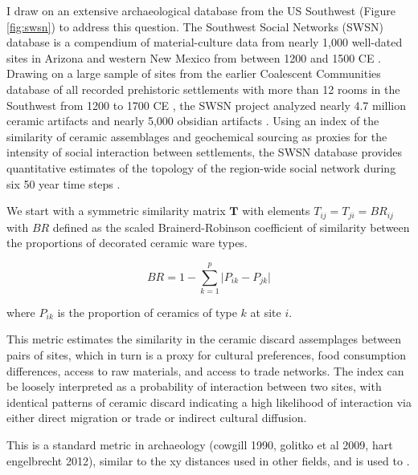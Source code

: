 \documentclass[fleqn,10pt]{wlscirep}
\begin{document}
I draw on an extensive archaeological database from the US Southwest (Figure \ref{fig:swsn}) to address this question. The Southwest Social Networks (SWSN) database is a compendium of material-culture data from nearly 1,000 well-dated sites in Arizona and western New Mexico from between 1200 and 1500 CE \cite{Mills2012,Mills2013a,Peeples2013,Borck2015,Hill2015,Mills2015a}. Drawing on a large sample of sites from the earlier Coalescent Communities database of all recorded prehistoric settlements with more than 12 rooms in the Southwest from 1200 to 1700 CE \cite{Hill2004}, the SWSN project analyzed nearly 4.7 million ceramic artifacts and nearly 5,000 obsidian artifacts \cite{Mills2015a}. Using an index of the similarity of ceramic assemblages and geochemical sourcing as proxies for the intensity of social interaction between settlements, the SWSN database provides quantitative estimates of the topology of the region-wide social network during six 50 year time steps \cite{Mills2013a}.


We start with a symmetric similarity matrix $\mathbf{T}$ with elements $T_{ij} = T_{ji} = BR_{ij}$ with $BR$ defined as the scaled Brainerd-Robinson coefficient of similarity between the proportions of decorated ceramic ware types.

$$BR = 1 - \sum_{k=1}^{p} \lvert P_{ik} - P_{jk} \rvert$$

where $P_{ik}$ is the proportion of ceramics of type $k$ at site $i$.

This metric estimates the similarity in the ceramic discard assemplages between pairs of sites, which in turn is a proxy for cultural preferences, food consumption differences, access to raw materials, and access to trade networks. The index can be loosely interpreted as a probability of interaction between two sites, with identical patterns of ceramic discard indicating a high likelihood of interaction via either direct migration or trade or indirect cultural diffusion.

This is a standard metric in archaeology (cowgill 1990, golitko et al 2009, hart engelbrecht 2012), similar to the xy distances used in other fields, and is used to .
\end{document}
